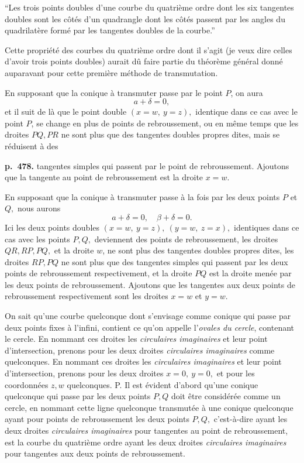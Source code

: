 \documentclass[11pt]{article}
\begin{document}
``Les trois points doubles d'une courbe du quatri\`eme ordre dont les six tangentes doubles sont les c\^ot\'es d'un quadrangle dont les c\^ot\'es passent par les angles du quadrilat\`ere form\'e par les tangentes doubles de la courbe.''

Cette propri\'et\'e des courbes du quatri\`eme ordre dont il s'agit (je veux dire celles d'avoir trois points doubles) aurait d\^u faire partie du th\'eor\`eme g\'en\'eral donn\'e auparavant pour cette premi\`ere m\'ethode de transmutation.

En supposant que la conique \`a transmuter passe par le point $P$, on aura
\[ a + \delta = 0, \]
et il suit de l\`a que le point double $(x = w,\ y = z),$ identique dans ce cas avec le point $P$, se change en plus de points de rebroussement, ou en m\^eme temps que les droites $PQ, PR$ ne sont plus que des tangentes doubles propres dites, mais se r\'eduisent \`a des

\bigskip
\noindent\textbf{p.~478.} tangentes simples qui passent par le point de rebroussement. Ajoutons que la tangente au point de rebroussement est la droite $x = w$.

En supposant que la conique \`a transmuter passe \`a la fois par les deux points $P$ et $Q,$ nous aurons
\[ a + \delta = 0,\quad \beta + \delta = 0. \]
Ici les deux points doubles $(x = w,\ y = z),\ (y = w,\ z = x),$ identiques dans ce cas avec les points $P, Q,$ deviennent des points de rebroussement, les droites $QR, RP, PQ,$ et la droite $w$, ne sont plus des tangentes doubles propres dites, les droites $RP, PQ$ ne sont plus que des tangentes simples qui passent par les deux points de rebroussement respectivement, et la droite $PQ$ est la droite men\'ee par les deux points de rebroussement. Ajoutons que les tangentes aux deux points de rebroussement respectivement sont les droites $x = w$ et $y = w$.

On sait qu'une courbe quelconque dont s'envisage comme conique qui passe par deux points fixes \`a l'infini, contient ce qu'on appelle l'\textit{ovales du cercle}, contenant le cercle. En nommant ces droites les \textit{circulaires imaginaires} et leur point d'intersection, prenons pour les deux droites \textit{circulaires imaginaires} comme quelconques. En nommant ces droites les \textit{circulaires imaginaires} et leur point d'intersection, prenons pour les deux droites $x = 0,\ y = 0,$ et pour les coordonn\'ees $z, w$ quelconques. P. Il est \'evident d'abord qu'une conique quelconque qui passe par les deux points $P, Q$ doit \^etre consid\'er\'ee comme un cercle, en nommant cette ligne quelconque transmut\'ee \`a une conique quelconque ayant pour points de rebroussement les deux points $P, Q,$ c'est-\`a-dire ayant les deux droites \textit{circulaires imaginaires} pour tangentes au point de rebroussement, est la courbe du quatri\`eme ordre ayant les deux droites \textit{circulaires imaginaires} pour tangentes aux deux points de rebroussement.
\end{document}
